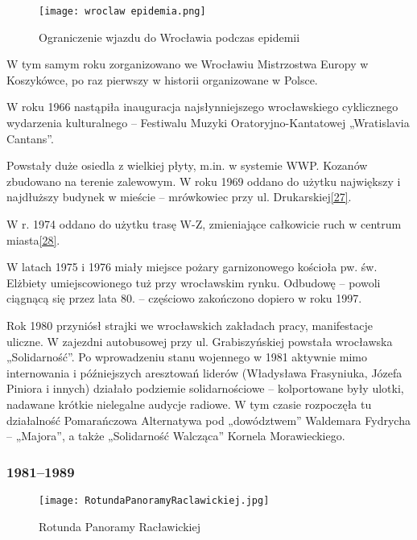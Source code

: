 \documentclass{article}
\begin{document}
\begin{wrapfigure}{r}{0.42\textwidth} 
\begin{center}
\vspace{-20pt}
\texttt{[image: wroclaw epidemia.png]}
\end{center}
\vspace{-20pt}
\caption{Ograniczenie wjazdu do Wrocławia podczas epidemii}
\vspace{-10pt}
\end{wrapfigure}

W tym samym roku zorganizowano we Wrocławiu Mistrzostwa Europy w Koszykówce, po raz pierwszy w historii organizowane w Polsce.

W roku 1966 nastąpiła inauguracja najsłynniejszego wrocławskiego cyklicznego wydarzenia kulturalnego – Festiwalu Muzyki Oratoryjno-Kantatowej „Wratislavia Cantans”.

Powstały duże osiedla z wielkiej płyty, m.in. w systemie WWP. Kozanów zbudowano na terenie zalewowym. W roku 1969 oddano do użytku największy i najdłuższy budynek w mieście – mrówkowiec przy ul. Drukarskiej\hyperref[27]{[27]}.

W r. 1974 oddano do użytku trasę W-Z, zmieniające całkowicie ruch w centrum miasta\hyperref[28]{[28]}.

W latach 1975 i 1976 miały miejsce pożary garnizonowego kościoła pw. św. Elżbiety umiejscowionego tuż przy wrocławskim rynku. Odbudowę – powoli ciągnącą się przez lata 80. – częściowo zakończono dopiero w roku 1997.

Rok 1980 przyniósł strajki we wrocławskich zakładach pracy, manifestacje uliczne. W zajezdni autobusowej przy ul. Grabiszyńskiej powstała wrocławska „Solidarność”. Po wprowadzeniu stanu wojennego w 1981 aktywnie mimo internowania i późniejszych aresztowań liderów (Władysława Frasyniuka, Józefa Piniora i innych) działało podziemie solidarnościowe – kolportowane były ulotki, nadawane krótkie nielegalne audycje radiowe. W tym czasie rozpoczęła tu działalność Pomarańczowa Alternatywa pod „dowództwem” Waldemara Fydrycha – „Majora”, a także „Solidarność Walcząca” Kornela Morawieckiego.

\subsubsection{1981–1989}

\begin{wrapfigure}{r}{0.42\textwidth} 
\begin{center}
\vspace{-20pt}
\texttt{[image: RotundaPanoramyRaclawickiej.jpg]}
\end{center}
\vspace{-20pt}
\caption{Rotunda Panoramy Racławickiej}
\vspace{-10pt}
\end{wrapfigure}
\end{document}
